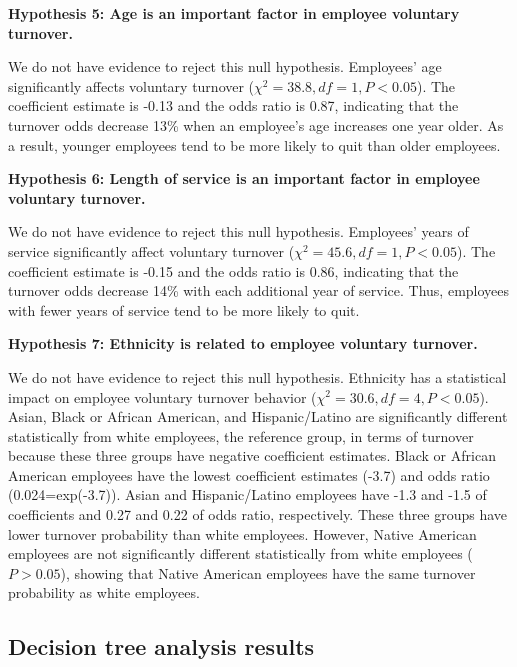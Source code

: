\textbf{Hypothesis 5: Age is an important factor in employee voluntary turnover.}

We do not have evidence to reject this null hypothesis. Employees’ age significantly affects voluntary turnover ($\chi^2=38.8, df=1, P<0.05$). The coefficient estimate is -0.13 and the odds ratio is 0.87, indicating that the turnover odds decrease 13\% when an employee’s age increases one year older. As a result, younger employees tend to be more likely to quit than older employees.    

\textbf{Hypothesis 6: Length of service is an important factor in employee voluntary turnover.}

We do not have evidence to reject this null hypothesis. Employees’ years of service significantly affect voluntary turnover ($\chi^2=45.6, df=1, P<0.05$). The coefficient estimate is -0.15 and the odds ratio is 0.86, indicating that the turnover odds decrease 14\% with each additional year of service. Thus, employees with fewer years of service tend to be more likely to quit.        

\textbf{Hypothesis 7: Ethnicity is related to employee voluntary turnover.}

We do not have evidence to reject this null hypothesis. Ethnicity has a statistical impact on employee voluntary turnover behavior ($\chi^2=30.6, df=4, P<0.05$). Asian, Black or African American, and Hispanic/Latino are significantly different statistically from white employees, the reference group, in terms of turnover because these three groups have negative coefficient estimates. Black or African American employees have the lowest coefficient estimates (-3.7) and odds ratio (0.024=exp(-3.7)). Asian and Hispanic/Latino employees have -1.3 and -1.5 of coefficients and 0.27 and 0.22 of odds ratio, respectively. These three groups have lower turnover probability than white employees. However, Native American employees are not significantly different statistically from white employees ($P > 0.05$), showing that Native American employees have the same turnover probability as white employees. 
\subsection{Decision tree analysis results}

